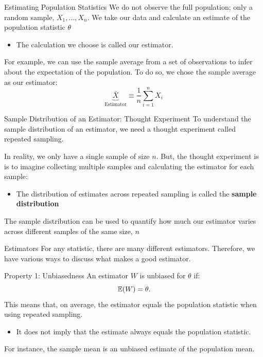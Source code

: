 \documentclass[aspectratio=169,t,11pt,table]{beamer}
\begin{document}
\begin{frame}{Estimating Population Statistics}
  We do not observe the full population; only \alert{a random sample}, $X_1, \dots, X_n$. We take our data and calculate an \alert{estimate} of the population statistic $\theta$
  \begin{itemize}
    \item The calculation we choose is called our \alert{estimator}.
  \end{itemize}

  \pause
  \bigskip
  For example, we can use the sample average from a set of observations to infer about the expectation of the population. To do so, we chose the sample average as our estimator:
  $$
    \underbrace{\bar{X}}_{\text{Estimator}} \equiv \frac{1}{n} \sum_{i=1}^n X_i
  $$
\end{frame}

\begin{frame}{Sample Distribution of an Estimator: Thought Experiment}
  To understand the \alert{sample distribution} of an estimator, we need a thought experiment called \alert{repeated sampling}. 
  
  \pause
  \bigskip
  In reality, we only have a single sample of size $n$. But, the thought experiment is  is to imagine collecting multiple samples and calculating the estimator for each sample:
  \begin{itemize}
    \item The distribution of estimates across repeated sampling is called the  \textbf{sample distribution}
  \end{itemize}

  \pause
  \bigskip
  The sample distribution can be used to quantify how much our estimator varies across different samples of the same size, $n$
\end{frame}

\begin{frame}{Estimators}
  For any statistic, there are many different estimators. Therefore, we have various ways to discuss what makes a good estimator.
\end{frame}

\begin{frame}{Property 1: Unbiasedness}
  An estimator $W$ is \alert{unbiased} for $\theta$ if:
  $$
    \expec{W} = \theta.
  $$
  \bigskip
  This means that, on average, the estimator equals the population statistic when using repeated sampling.  
  \begin{itemize}
    \item It does not imply that the estimate always equals the population statistic.
  \end{itemize}
  
  \pause
  \bigskip
  For instance, the sample mean is an unbiased estimate of the population mean.
\end{frame}
\end{document}
